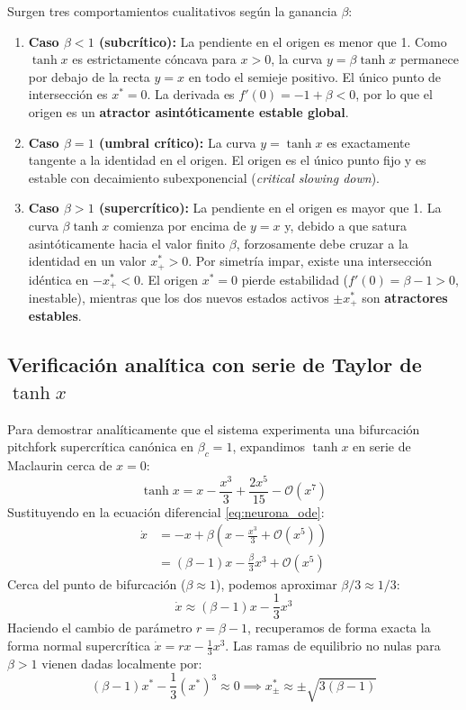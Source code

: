 Surgen tres comportamientos cualitativos según la ganancia $\beta$:
\begin{enumerate}
    \item \textbf{Caso $\beta < 1$ (subcrítico):} La pendiente en el origen es menor que 1. Como $\tanh x$ es estrictamente cóncava para $x > 0$, la curva $y = \beta\tanh x$ permanece por debajo de la recta $y = x$ en todo el semieje positivo. El único punto de intersección es $x^* = 0$.
    La derivada es $f'(0) = -1 + \beta < 0$, por lo que el origen es un \textbf{atractor asintóticamente estable global}.
    \item \textbf{Caso $\beta = 1$ (umbral crítico):} La curva $y = \tanh x$ es exactamente tangente a la identidad en el origen. El origen es el único punto fijo y es estable con decaimiento subexponencial (\emph{critical slowing down}).
    \item \textbf{Caso $\beta > 1$ (supercrítico):} La pendiente en el origen es mayor que 1. La curva $\beta\tanh x$ comienza por encima de $y = x$ y, debido a que satura asintóticamente hacia el valor finito $\beta$, forzosamente debe cruzar a la identidad en un valor $x_+^* > 0$. Por simetría impar, existe una intersección idéntica en $-x_+^* < 0$.
    El origen $x^* = 0$ pierde estabilidad ($f'(0) = \beta - 1 > 0$, inestable), mientras que los dos nuevos estados activos $\pm x_+^*$ son \textbf{atractores estables}.
\end{enumerate}

\subsection{Verificación analítica con serie de Taylor de $\tanh x$}

Para demostrar analíticamente que el sistema experimenta una bifurcación pitchfork supercrítica canónica en $\beta_c = 1$, expandimos $\tanh x$ en serie de Maclaurin cerca de $x = 0$:
\begin{equation}
    \tanh x = x - \frac{x^3}{3} + \frac{2x^5}{15} - \mathcal{O}(x^7)
\end{equation}
Sustituyendo en la ecuación diferencial \eqref{eq:neurona_ode}:
\begin{align}
    \dot{x} &= -x + \beta \left(x - \frac{x^3}{3} + \mathcal{O}(x^5)\right) \nonumber \\
    &= (\beta - 1)x - \frac{\beta}{3}x^3 + \mathcal{O}(x^5)
    \label{eq:taylor_neurona}
\end{align}
Cerca del punto de bifurcación ($\beta \approx 1$), podemos aproximar $\beta/3 \approx 1/3$:
\begin{equation}
    \dot{x} \approx (\beta - 1)x - \frac{1}{3}x^3
\end{equation}
Haciendo el cambio de parámetro $r = \beta - 1$, recuperamos de forma exacta la forma normal supercrítica $\dot{x} = rx - \frac{1}{3}x^3$. Las ramas de equilibrio no nulas para $\beta > 1$ vienen dadas localmente por:
\begin{equation}
    (\beta - 1)x^* - \frac{1}{3}(x^*)^3 \approx 0 \implies x_\pm^* \approx \pm\sqrt{3(\beta - 1)}
    \label{eq:ramas_analiticas_neurona}
\end{equation}

